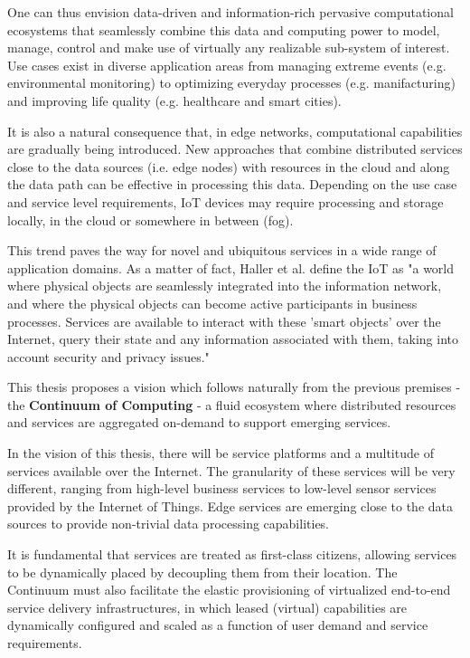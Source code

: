 \documentclass{ieeeaccess}
\begin{document}
One can thus envision data-driven and information-rich pervasive computational ecosystems that seamlessly combine this data and computing power to model, manage, control and make use of virtually any realizable sub-system of interest. Use cases exist in diverse application areas from managing extreme events (e.g. environmental monitoring) to optimizing everyday processes (e.g. manifacturing) and improving life quality (e.g. healthcare and smart cities).

It is also a natural consequence that, in edge networks, computational capabilities are gradually being introduced. New approaches that combine distributed services close to the data sources (i.e. edge nodes) with resources in the cloud and along the data path can be effective in processing this data. Depending on the use case and service level requirements, IoT devices may require processing and storage locally, in the cloud or somewhere in between (fog).

This trend paves the way for novel and ubiquitous services in a wide range of application domains. As a matter of fact, Haller et al. \cite{iot-enterprise} define the IoT as "a world where physical objects are seamlessly integrated into the information network, and where the physical objects can become active participants in business processes. Services are available to interact with these 'smart objects' over the Internet, query their state and any information associated with them, taking into account security and privacy issues."

This thesis proposes a vision which follows naturally from the previous premises - the \textbf{Continuum of Computing} - a fluid ecosystem where distributed resources and services are aggregated on-demand to support emerging services.

In the vision of this thesis, there will be service platforms and a multitude of services available over the Internet. The granularity of these services will be very different, ranging from high-level business services to low-level sensor services provided by the Internet of Things. Edge services are emerging close to the data sources to provide non-trivial data processing capabilities.

It is fundamental that services are treated as first-class citizens, allowing services to be dynamically placed by decoupling them from their location. The Continuum must also facilitate the elastic provisioning of virtualized end-to-end service delivery infrastructures, in which leased (virtual) capabilities are dynamically configured and scaled as a function of user demand and service requirements.
\end{document}
